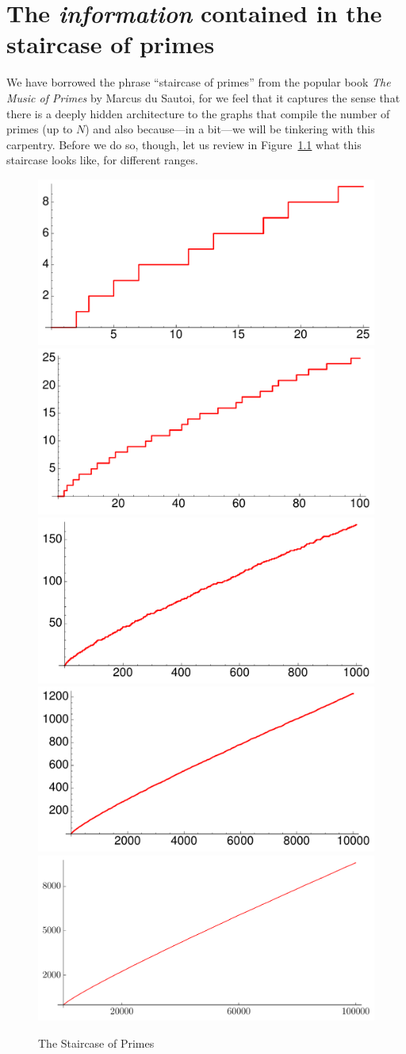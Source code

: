 \documentclass[openany]{book}
\theoremstyle{plain}
\theoremstyle{definition}
\begin{document}
\chapter[The staircase of primes]{The {\em information} contained in the staircase of primes\label{sec:information}}
 


We have borrowed the phrase ``staircase of primes'' from the popular
book {\em The Music of Primes} by Marcus du Sautoi, for we feel that
it captures the sense that there is a deeply hidden architecture to
the graphs that compile the number of primes (up to $N$) and also
because---in a bit---we will be tinkering with this carpentry.  Before
we do so, though, let us review in Figure~\ref{fig:staircases}
what this staircase looks like, for
different ranges.

\begin{figure}[H]
\centering
\includegraphics[width=.4\textwidth]{illustrations/PN_25} 
\includegraphics[width=.4\textwidth]{illustrations/PN_100}\\ 

\includegraphics[width=.4\textwidth]{illustrations/PN_1000}
\includegraphics[width=.4\textwidth]{illustrations/PN_10000}\\ 

\includegraphics[width=.6\textwidth]{illustrations/PN_100000}


\caption{The Staircase of Primes\label{fig:staircases}}
\end{figure}
\end{document}
